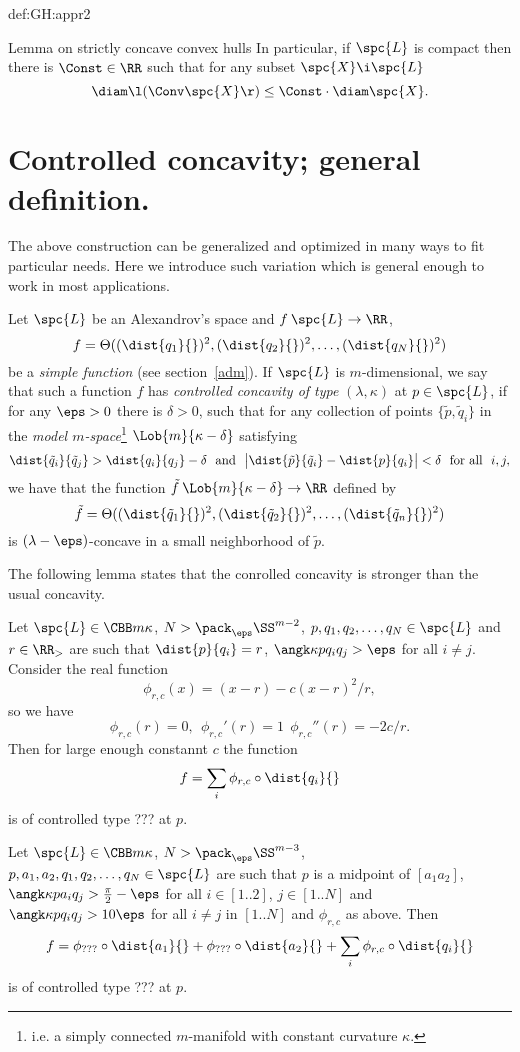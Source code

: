 {\begin{subthm}{def:GH:appr2}
\begin{thm}{Lemma on strictly concave convex hulls \cite[4.3]{perelman-petrunin:extremal}}
In particular, if $\spc{L}$ is compact then there is $\Const\in \RR$ such that for
any subset $\spc{X}\i \spc{L}$
$$\diam \l(\Conv \spc{X} \r)\le \Const\cdot\diam \spc{X}.$$
\end{thm}





\section{Controlled concavity; general definition.} 
The above construction can be generalized and optimized in many ways to fit
particular needs. 
Here we introduce such variation which is general enough to work in most applications.

Let $\spc{L}$ be an Alexandrov's space and $f\:\spc{L}\to \RR$,
$$f=\Theta((\dist{q_1}{})^2,(\dist{q_2}{})^2,\dots,(\dist{q_N}{})^2)$$ be a \emph{simple
function} (see section~\ref{adm}).
If $\spc{L}$ is $m$-dimensional, we say that such a function $f$ has \emph{controlled
concavity of type} $(\lambda,\kappa)$ at $p\in \spc{L}$, if for any $\eps>0$ there is
$\delta>0$, such that for any collection of points $\{\tilde  p,\tilde  q_i\}$ in
the \emph{model $m$-space}\footnote{i.e. a simply connected $m$-manifold with
constant curvature $\kappa$.} $\Lob{m}{\kappa-\delta}$  satisfying 
$$\dist{\tilde  q_i}{\tilde  q_j}> \dist{q_i}{q_j}-\delta
\ \ \text{and}\ \  
\bigl|\dist{\tilde p}{\tilde q_i}-\dist{p}{q_i}\bigr|<\delta \ \ \text{for all}\ \ i,j,$$ 
we have that the function 
$\tilde  f\:\Lob{m}{\kappa-\delta}\to \RR$ defined by 
$$\tilde  f
=\Theta((\dist{\tilde q_1}{})^2,(\dist{\tilde  q_2}{})^2,\dots,(\dist{\tilde q_n}{})^2)$$
is $(\lambda-\eps)$-concave in a small neighborhood of $\tilde p$.

The following lemma states that the conrolled concavity is stronger than the usual
concavity.

 Let $\spc{L}\in\CBB m \kappa$, $N>\pack_\eps\SS^{m-2}$, $p,q_1,q_2,\dots,q_N\in \spc{L}$ and $r\in\RR_>$ are such that 
$\dist{p}{q_i}=r$, 
$\angk\kappa p{q_i}{q_j}>\eps$ for all $i\not=j$.
Consider the real function 
$$\phi_{r,c}(x)=(x-r)- c{(x-r)^2}/r,$$
so we have 
$$\phi_{r,c}(r)=0,\ \ \phi_{r,c}'(r)=1\ \ \phi_{r,c}''(r)=- {2c}/{r}.$$ 
Then for large enough constannt $c$ the function
$$f=\sum_i \phi_{r,c}\circ\dist{q_i}{}$$
is of controlled type ??? at $p$.

Let $\spc{L}\in\CBB m \kappa$, $N>\pack_\eps\SS^{m-3}$, $p,a_1,a_2,q_1,q_2,\dots,q_N\in \spc{L}$ are such that $p$ is a midpoint of $[a_1a_2]$, 
$\angk\kappa p{a_i}{q_j}>\tfrac{\pi}{2}-\eps$ for all $i\in[1..2]$, $j\in[1..N]$
and
$\angk\kappa p{q_i}{q_j}>10\eps$ for all $i\not=j$ in $[1..N]$ and $\phi_{r,c}$ as above.
Then 
$$f=\phi_{???}\circ\dist{a_1}{}+\phi_{???}\circ\dist{a_2}{}+\sum_i \phi_{r,c}\circ\dist{q_i}{}$$
is of controlled type ??? at $p$.






\end{subthm}}
